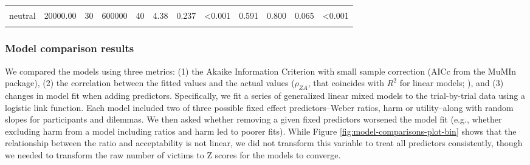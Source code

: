 \documentclass[
]{article}
\begin{document}
\begin{longtable}[t]{lrrrrrrlrrrl}
\hspace{1em}\cellcolor{gray!10}{neutral} & \cellcolor{gray!10}{15000.00} & \cellcolor{gray!10}{200} & \cellcolor{gray!10}{3000000} & \cellcolor{gray!10}{40} & \cellcolor{gray!10}{4.62} & \cellcolor{gray!10}{0.248} & \cellcolor{gray!10}{<0.001} & \cellcolor{gray!10}{0.727} & \cellcolor{gray!10}{0.750} & \cellcolor{gray!10}{0.070} & \cellcolor{gray!10}{0.002}\\
\hspace{1em}neutral & 20000.00 & 30 & 600000 & 40 & 4.38 & 0.237 & <0.001 & 0.591 & 0.800 & 0.065 & <0.001\\
\hspace{1em}\cellcolor{gray!10}{neutral} & \cellcolor{gray!10}{20000.00} & \cellcolor{gray!10}{100} & \cellcolor{gray!10}{2000000} & \cellcolor{gray!10}{41} & \cellcolor{gray!10}{4.63} & \cellcolor{gray!10}{0.220} & \cellcolor{gray!10}{<0.001} & \cellcolor{gray!10}{0.815} & \cellcolor{gray!10}{0.854} & \cellcolor{gray!10}{0.057} & \cellcolor{gray!10}{<0.001}\\
\bottomrule
\end{longtable}
\endgroup{}

\clearpage

\subsubsection{Model comparison results}\label{app:model-comparisons}

We compared the models using three metrics: (1) the Akaike Information Criterion with small sample correction (AICc from the MuMIn package), (2) the correlation between the fitted values and the actual values (\(\rho_{ZA}\), that coincides with \(R^2\) for linear models; \autocite{Zheng2000}), and (3) changes in model fit when adding predictors. Specifically, we fit a series of generalized linear mixed models to the trial-by-trial data using a logistic link function. Each model included two of three possible fixed effect predictors--Weber ratios, harm or utility--along with random slopes for participants and dilemmas. We then asked whether removing a given fixed predictors worsened the model fit (e.g., whether excluding harm from a model including ratios and harm led to poorer fits). While Figure \ref{fig:model-comparisons-plot-bin} shows that the relationship between the ratio and acceptability is not linear, we did not transform this variable to treat all predictors consistently, though we needed to transform the raw number of victims to Z scores for the models to converge.
\end{document}
